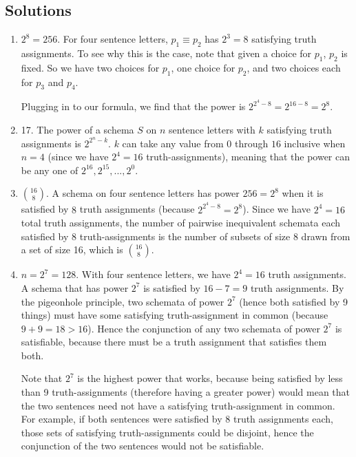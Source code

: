 \newpage
\begin{mdframed}[linewidth=1]
\section*{Solutions}
\begin{enumerate}
    \item $2^8 = 256$. For four sentence letters, $p_1 \equiv p_2$ has $2^3 = 8$ satisfying truth assignments. To see why this is the case, note that given a choice for $p_1$, $p_2$ is fixed. So we have two choices for $p_1$, one choice for $p_2$, and two choices each for $p_3$ and $p_4$.

    Plugging in to our formula, we find that the power is $2^{2^4 - 8} = 2^{16 - 8} = 2^8$. 

    \item 17. The power of a schema $S$ on $n$ sentence letters with $k$ satisfying truth assignments is $2^{2^n - k}$. $k$ can take any value from $0$ through $16$ inclusive when $n = 4$ (since we have $2^4 = 16$ truth-assignments), meaning that the power can be any one of $2^{16}, 2^{15}, ... , 2^0$.

    \item $\binom{16}{8}$. A schema on four sentence letters has power $256 = 2^8$ when it is satisfied by $8$ truth assignments (because $2^{2^4 - 8} = 2^8$). Since we have $2^4 = 16$ total truth assignments, the number of pairwise inequivalent schemata each satisfied by 8 truth-assignments is the number of subsets of size 8 drawn from a set of size 16, which is $\binom{16}{8}$. 

    \item $n = 2^7 = 128$. With four sentence letters, we have $2^4 = 16$ truth assignments. A schema that has power $2^7$ is satisfied by $16 - 7 = 9$ truth assignments. By the pigeonhole principle, two schemata of power $2^7$ (hence both satisfied by 9 things) must have some satisfying truth-assignment in common (because $9 + 9 = 18 > 16$). Hence the conjunction of any two schemata of power $2^7$ is satisfiable, because there must be a truth assignment that satisfies them both. 

    Note that $2^7$ is the highest power that works, because being satisfied by less than 9 truth-assignments (therefore having a greater power) would mean that the two sentences need not have a satisfying truth-assignment in common. For example, if both sentences were satisfied by 8 truth assignments each, those sets of satisfying truth-assignments could be disjoint, hence the conjunction of the two sentences would not be satisfiable. 


\end{enumerate}
\end{mdframed}
